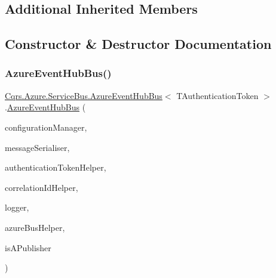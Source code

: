 \subsection*{Additional Inherited Members}


\subsection{Constructor \& Destructor Documentation}
\mbox{\label{classCqrs_1_1Azure_1_1ServiceBus_1_1AzureEventHubBus_aef24d23dd76d6bb0f58b582e2abf9872_aef24d23dd76d6bb0f58b582e2abf9872}} 
\subsubsection{\texorpdfstring{Azure\+Event\+Hub\+Bus()}{AzureEventHubBus()}}
{\footnotesize\ttfamily \hyperlink{classCqrs_1_1Azure_1_1ServiceBus_1_1AzureEventHubBus}{Cqrs.\+Azure.\+Service\+Bus.\+Azure\+Event\+Hub\+Bus}$<$ T\+Authentication\+Token $>$.\hyperlink{classCqrs_1_1Azure_1_1ServiceBus_1_1AzureEventHubBus}{Azure\+Event\+Hub\+Bus} (\begin{DoxyParamCaption}\item[{\hyperlink{interfaceCqrs_1_1Configuration_1_1IConfigurationManager}{I\+Configuration\+Manager}}]{configuration\+Manager,  }\item[{\hyperlink{interfaceCqrs_1_1Azure_1_1ServiceBus_1_1IMessageSerialiser}{I\+Message\+Serialiser}$<$ T\+Authentication\+Token $>$}]{message\+Serialiser,  }\item[{\hyperlink{interfaceCqrs_1_1Authentication_1_1IAuthenticationTokenHelper}{I\+Authentication\+Token\+Helper}$<$ T\+Authentication\+Token $>$}]{authentication\+Token\+Helper,  }\item[{I\+Correlation\+Id\+Helper}]{correlation\+Id\+Helper,  }\item[{I\+Logger}]{logger,  }\item[{\hyperlink{interfaceCqrs_1_1Azure_1_1ServiceBus_1_1IAzureBusHelper}{I\+Azure\+Bus\+Helper}$<$ T\+Authentication\+Token $>$}]{azure\+Bus\+Helper,  }\item[{bool}]{is\+A\+Publisher }\end{DoxyParamCaption})\hspace{0.3cm}{\ttfamily [protected]}}



